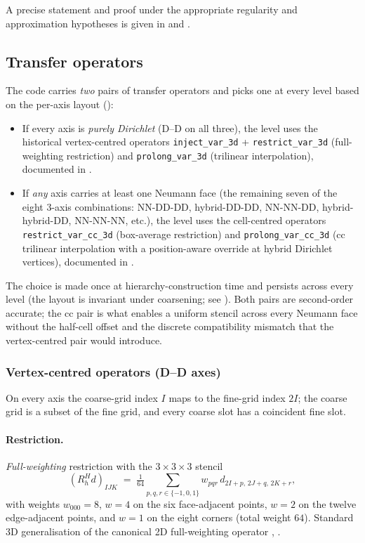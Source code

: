 \documentclass[11pt]{article}
\theoremstyle{definition}
\begin{document}
A precise statement and proof under the appropriate regularity and
approximation hypotheses is given in
\cite[Ch.~6]{hackbusch1985multi} and \cite[Ch.~7]{trottenberg2001multigrid}.

\subsection{Transfer operators}\label{sec:transfer}
The code carries \emph{two} pairs of transfer operators and picks one
at every level based on the per-axis layout
():
\begin{itemize}
\item If every axis is \emph{purely Dirichlet} (D--D on all three),
  the level uses the historical vertex-centred operators
  \texttt{inject\_var\_3d} + \texttt{restrict\_var\_3d} (full-weighting
  restriction) and \texttt{prolong\_var\_3d} (trilinear interpolation),
  documented in
  .
\item If \emph{any} axis carries at least one Neumann face (the
  remaining seven of the eight 3-axis combinations: NN-DD-DD,
  hybrid-DD-DD, NN-NN-DD, hybrid-hybrid-DD, NN-NN-NN, etc.),
  the level uses the cell-centred operators
  \texttt{restrict\_var\_cc\_3d} (box-average restriction) and
  \texttt{prolong\_var\_cc\_3d} (cc trilinear interpolation with a
  position-aware override at hybrid Dirichlet vertices), documented
  in .
\end{itemize}
The choice is made once at hierarchy-construction time and persists
across every level (the layout is invariant under coarsening; see
).  Both pairs are second-order accurate; the
cc pair is what enables a uniform stencil across every Neumann face
without the half-cell offset and the discrete compatibility mismatch
that the vertex-centred pair would introduce.

\subsubsection{Vertex-centred operators (D--D axes)}\label{sec:transfer-dd}
On every axis the coarse-grid index $I$ maps to the fine-grid index
$2I$; the coarse grid is a subset of the fine grid, and every coarse
slot has a coincident fine slot.

\paragraph{Restriction.}
\emph{Full-weighting} restriction with the $3\times 3\times 3$
stencil
\begin{equation}\label{eq:full-weighting}
  (R_h^H d)_{IJK} \;=\; \tfrac{1}{64}\!\!
  \sum_{p,q,r\in\{-1,0,1\}}\!\! w_{pqr}\, d_{2I+p,\,2J+q,\,2K+r},
\end{equation}
with weights $w_{000}=8$, $w=4$ on the six face-adjacent points,
$w=2$ on the twelve edge-adjacent points, and $w=1$ on the eight
corners (total weight $64$).  Standard 3D generalisation of the
canonical 2D full-weighting operator
\cite[\S3.5]{briggs2000multigrid}, \cite[\S2.3]{trottenberg2001multigrid}.
\end{document}

